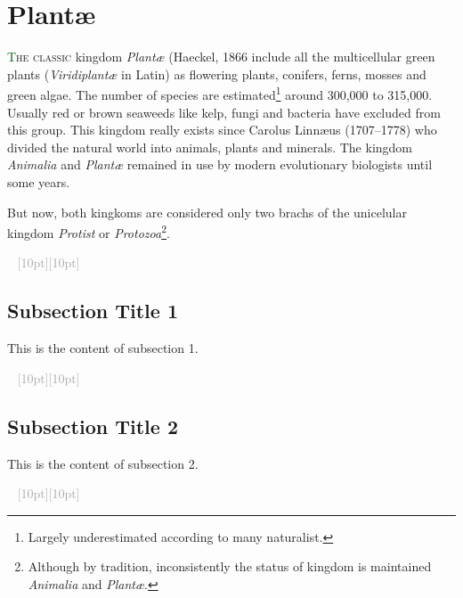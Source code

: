 \documentclass[twoside,12pt,english]{article}
\newcommand*\initfamily{\usefont{U}{Acorn}{xl}{n}}
\newcommand{\ornamento}{\vspace{2em}\noindent \textcolor{darkgray}{\hrulefill~ \raisebox{-2.5pt}[10pt][10pt]{\leafright \decofourleft \decothreeleft  \aldineright \decotwo \floweroneleft \decoone   \floweroneright \decotwo \aldineleft\decothreeright \decofourright \leafleft} ~  \hrulefill \\ \vspace{2em}}}
\begin{document}


\section*{Plant\ae}
\lettrine[lines=3]{\initfamily\textcolor{darkgreen}{T}}{he classic} kingdom \emph{Plant\ae} (Haeckel, 1866
include all the multicellular green plants (\emph{Viridiplant\ae} in Latin) as flowering  
plants, conifers, ferns, mosses and green algae. The number of species 
are estimated\footnote{Largely underestimated according to many naturalist.} around 300,000 to 315,000. 
Usually red or brown seaweeds like kelp, fungi and bacteria have
excluded from this group.
This kingdom really exists since Carolus Linn\ae us (1707--1778) who 
divided the natural world into animals, plants and minerals. The kingdom \emph{Animalia}  and \emph{Plant\ae} remained 
in use by modern evolutionary biologists until some years.  

But now, both kingkoms are considered only two brachs of the unicelular kingdom \emph{Protist} 
or \emph{Protozoa}\footnote{Although by tradition,  inconsistently the status of kingdom 
is maintained \emph{Animalia}  and \emph{Plant\ae}.}.  
\lipsum[2]

\lipsum[3]


\ornamento

\subsection{Subsection Title 1}
This is the content of subsection 1.

\ornamento

\subsection{Subsection Title 2}
This is the content of subsection 2.

\ornamento
\end{document}
